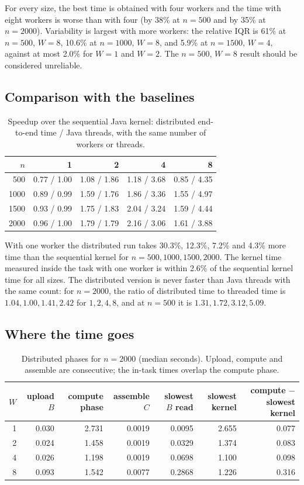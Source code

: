 \documentclass[11pt,a4paper]{article}
\begin{document}
For every size, the best time is obtained with four workers and the time with eight workers is
worse than with four (by 38\% at $n=500$ and by 35\% at $n=2000$). Variability is largest with
more workers: the relative IQR is 61\% at $n=500$, $W=8$, 10.6\% at $n=1000$, $W=8$, and
5.9\% at $n=1500$, $W=4$, against at most 2.0\% for $W=1$ and $W=2$. The $n=500$, $W=8$ result should be
considered unreliable.

\subsection{Comparison with the baselines}
\begin{table}[H]
\centering
\caption{Speedup over the sequential Java kernel: distributed end-to-end time / Java threads, with the same number of workers or threads.}
\small
\begin{tabular}{@{}rrrrr@{}}
\toprule
$n$ & 1 & 2 & 4 & 8 \\
\midrule
500  & 0.77 / 1.00 & 1.08 / 1.86 & 1.18 / 3.68 & 0.85 / 4.35 \\
1000 & 0.89 / 0.99 & 1.59 / 1.76 & 1.86 / 3.36 & 1.55 / 4.97 \\
1500 & 0.93 / 0.99 & 1.75 / 1.83 & 2.04 / 3.24 & 1.59 / 4.44 \\
2000 & 0.96 / 1.00 & 1.79 / 1.79 & 2.16 / 3.06 & 1.61 / 3.88 \\
\bottomrule
\end{tabular}
\end{table}
With one worker the distributed run takes 30.3\%, 12.3\%, 7.2\% and 4.3\% more time than the
sequential kernel for $n=500,1000,1500,2000$. The kernel time measured inside the task with
one worker is within 2.6\% of the sequential kernel time for all sizes. The distributed
version is never faster than Java threads with the same count: for $n=2000$, the ratio of
distributed time to threaded time is $1.04, 1.00, 1.41, 2.42$ for $1, 2, 4, 8$, and at
$n=500$ it is $1.31, 1.72, 3.12, 5.09$.

\subsection{Where the time goes}
\begin{table}[H]
\centering
\caption{Distributed phases for $n=2000$ (median seconds). Upload, compute and assemble are consecutive; the in-task times overlap the compute phase.}
\small
\begin{tabular}{@{}rrrrrrr@{}}
\toprule
$W$ & upload $B$ & compute phase & assemble $C$ & slowest $B$ read & slowest kernel & compute $-$ slowest kernel \\
\midrule
1 & 0.030 & 2.731 & 0.0019 & 0.0095 & 2.655 & 0.077 \\
2 & 0.024 & 1.458 & 0.0019 & 0.0329 & 1.374 & 0.083 \\
4 & 0.026 & 1.198 & 0.0019 & 0.0698 & 1.100 & 0.098 \\
8 & 0.093 & 1.542 & 0.0077 & 0.2868 & 1.226 & 0.316 \\
\bottomrule
\end{tabular}
\end{table}
\end{document}

